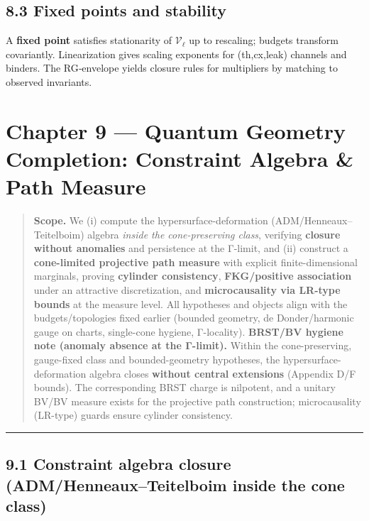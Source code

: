 \documentclass[
]{article}
\numberwithin{equation}{section}
\begin{document}
\hypertarget{fixed-points-and-stability}{%
\subsection{8.3 Fixed points and
stability}\label{fixed-points-and-stability}}

A \textbf{fixed point} satisfies stationarity of \(\mathcal V_\ell\) up
to rescaling; budgets transform covariantly. Linearization gives scaling
exponents for (th,cx,leak) channels and binders. The RG‑envelope yields
closure rules for multipliers by matching to observed invariants.

\hypertarget{chapter-9-quantum-geometry-completion-constraint-algebra-path-measure}{%
\section{Chapter 9 --- Quantum Geometry Completion: Constraint Algebra
\& Path
Measure}\label{chapter-9-quantum-geometry-completion-constraint-algebra-path-measure}}

\begin{quote}
\textbf{Scope.} We (i) compute the hypersurface-deformation
(ADM/Henneaux--Teitelboim) algebra \emph{inside the cone-preserving
class}, verifying \textbf{closure without anomalies} and persistence at
the Γ-limit, and (ii) construct a \textbf{cone-limited projective path
measure} with explicit finite-dimensional marginals, proving
\textbf{cylinder consistency}, \textbf{FKG/positive association} under
an attractive discretization, and \textbf{microcausality via LR-type
bounds} at the measure level. All hypotheses and objects align with the
budgets/topologies fixed earlier (bounded geometry, de Donder/harmonic
gauge on charts, single-cone hygiene, Γ-locality). \textbf{BRST/BV
hygiene note (anomaly absence at the Γ-limit).} Within the
cone-preserving, gauge-fixed class and bounded-geometry hypotheses, the
hypersurface-deformation algebra closes \textbf{without central
extensions} (Appendix D/F bounds). The corresponding BRST charge is
nilpotent, and a unitary BV/BV measure exists for the projective path
construction; microcausality (LR-type) guards ensure cylinder
consistency.
\end{quote}

\begin{center}\rule{0.5\linewidth}{0.5pt}\end{center}

\hypertarget{constraint-algebra-closure-admhenneauxteitelboim-inside-the-cone-class}{%
\subsection{9.1 Constraint algebra closure (ADM/Henneaux--Teitelboim
inside the cone
class)}\label{constraint-algebra-closure-admhenneauxteitelboim-inside-the-cone-class}}
\end{document}
